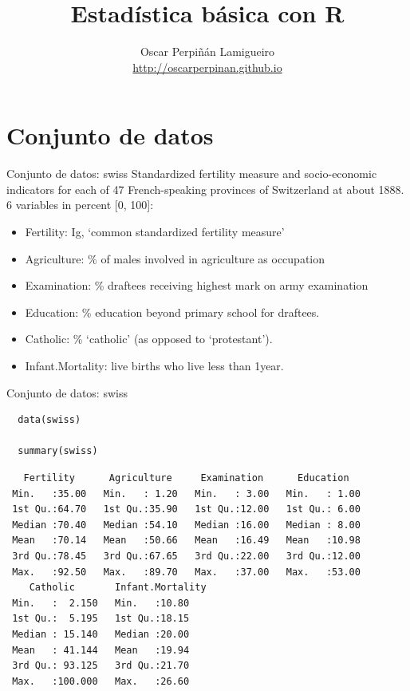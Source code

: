 \documentclass[xcolor={usenames,svgnames,dvipsnames}]{beamer}
\author{Oscar Perpiñán Lamigueiro \\ \url{http://oscarperpinan.github.io}}
\date{}
\title{Estadística básica con R}
\begin{document}
\maketitle

\section{Conjunto de datos}
\label{sec-1}

\begin{frame}[label=sec-1-1]{Conjunto de datos: swiss}
Standardized fertility measure and socio-economic indicators for
each of 47 French-speaking provinces of Switzerland at
about 1888. 6 variables in percent [0, 100]:

\begin{itemize}
\item \alert{Fertility}:         Ig, ‘common standardized fertility measure’
\item \alert{Agriculture}:       \% of males involved in agriculture as occupation
\item \alert{Examination}:       \% draftees receiving highest mark on army examination
\item \alert{Education}:         \% education beyond primary school for draftees.
\item \alert{Catholic}:          \% ‘catholic’ (as opposed to ‘protestant’).
\item \alert{Infant.Mortality}:  live births who live less than 1year.
\end{itemize}
\end{frame}

\begin{frame}[fragile,label=sec-1-2]{Conjunto de datos: swiss}
 \lstset{language=R,label= ,caption= ,numbers=none}
\begin{lstlisting}
  data(swiss)
  
  summary(swiss)
\end{lstlisting}

\begin{verbatim}
   Fertility      Agriculture     Examination      Education    
 Min.   :35.00   Min.   : 1.20   Min.   : 3.00   Min.   : 1.00  
 1st Qu.:64.70   1st Qu.:35.90   1st Qu.:12.00   1st Qu.: 6.00  
 Median :70.40   Median :54.10   Median :16.00   Median : 8.00  
 Mean   :70.14   Mean   :50.66   Mean   :16.49   Mean   :10.98  
 3rd Qu.:78.45   3rd Qu.:67.65   3rd Qu.:22.00   3rd Qu.:12.00  
 Max.   :92.50   Max.   :89.70   Max.   :37.00   Max.   :53.00  
    Catholic       Infant.Mortality
 Min.   :  2.150   Min.   :10.80   
 1st Qu.:  5.195   1st Qu.:18.15   
 Median : 15.140   Median :20.00   
 Mean   : 41.144   Mean   :19.94   
 3rd Qu.: 93.125   3rd Qu.:21.70   
 Max.   :100.000   Max.   :26.60
\end{verbatim}
\end{frame}
\end{document}

